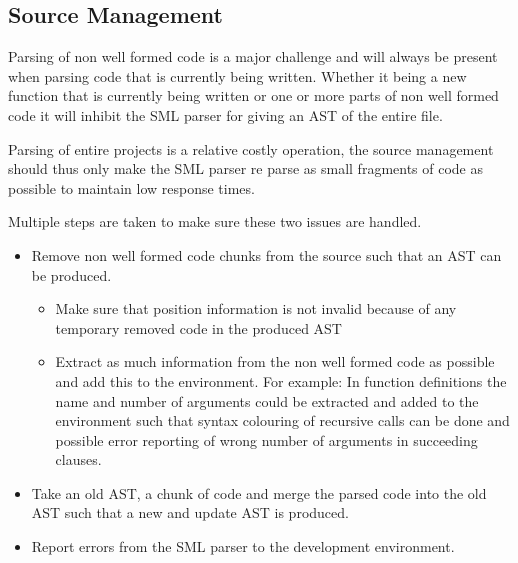\subsection{Source Management}

Parsing of non well formed code is a major challenge and will always be present
when parsing code that is currently being written. Whether it being a new
function that is currently being written or one or more parts of non well formed
code it will inhibit the SML parser for giving an AST of the entire file. 

Parsing of entire projects is a relative costly operation, the source management
should thus only make the SML parser re parse as small fragments of code as
possible to maintain low response times. 


Multiple steps are taken to make sure these two issues are handled. 

\begin{itemize}
\item Remove non well formed code chunks from the source such that an AST can be
  produced.
  \begin{itemize}
  \item Make sure that position information is not invalid because of any
    temporary removed code in the produced AST
  \item Extract as much information from the non well formed code as possible
    and add this to the environment. For example: In function definitions the
    name and number of arguments could be extracted and added to the environment
    such that syntax colouring of recursive calls can be done and possible error
    reporting of wrong number of arguments in succeeding clauses.
  \end{itemize}

\item Take an old AST, a chunk of code and merge the parsed code into
  the old AST such that a new and update AST is produced.

\item Report errors from the SML parser to the development environment.

\end{itemize}



